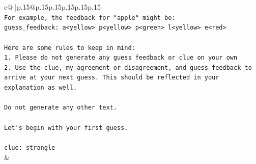 \documentclass{article}
\begin{document}
{\begin{supertabular}{c@{$\;$}|p{.15\linewidth}@{}p{.15\linewidth}p{.15\linewidth}p{.15\linewidth}p{.15\linewidth}p{.15\linewidth}}
{{{\\ 
\texttt{For example, the feedback for "apple" might be:} \\
\texttt{guess\_feedback: a<yellow> p<yellow> p<green> l<yellow> e<red>} \\
\\ 
\texttt{Here are some rules to keep in mind:} \\
\texttt{1. Please do not generate any guess feedback or clue on your own} \\
\texttt{2. Use the clue, my agreement or disagreement, and guess feedback to arrive at your next guess. This should be reflected in your explanation as well.} \\
\\ 
\texttt{Do not generate any other text.} \\
\\ 
\texttt{Let's begin with your first guess.} \\
\\ 
\texttt{clue: strangle} \\
            }
        }
    }
    & \\ \\


\end{supertabular}}
\end{document}
